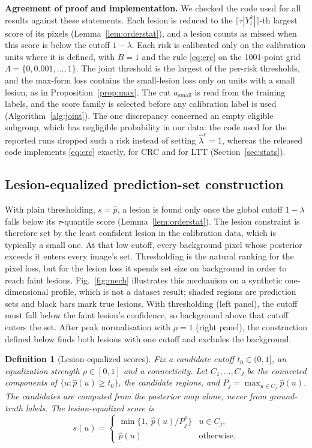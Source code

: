 \documentclass[sn-mathphys-num]{sn-jnl}%
\theoremstyle{thmstyleone}
\theoremstyle{thmstyletwo}
\theoremstyle{thmstylethree}
\newtheorem{definition}{Definition}
\newcommand{\1}{\mathbb{1}}
\newcommand{\lhat}{\hat\lambda}
\begin{document}
\textbf{Agreement of proof and implementation.} We checked the code used for all results against these statements. Each lesion is reduced to the $\lceil\tau|Y_i^k|\rceil$-th largest score of its pixels (Lemma~\ref{lem:orderstat}), and a lesion counts as missed when this score is below the cutoff $1-\lambda$. Each risk is calibrated only on the calibration units where it is defined, with $B=1$ and the rule \eqref{eq:crc} on the 1001-point grid $\Lambda=\{0,0.001,\dots,1\}$. The joint threshold is the largest of the per-risk thresholds, and the max-form loss contains the small-lesion loss only on units with a small lesion, as in Proposition~\ref{prop:max}. The cut $a_{\mathrm{small}}$ is read from the training labels, and the score family is selected before any calibration label is used (Algorithm~\ref{alg:joint}). The one discrepancy concerned an empty eligible subgroup, which has negligible probability in our data: the code used for the reported runs dropped such a risk instead of setting $\lhat^r=1$, whereas the released code implements \eqref{eq:crc} exactly, for CRC and for LTT (Section~\ref{sec:stats}).

\subsection{Lesion-equalized prediction-set construction}\label{sec:family}

With plain thresholding, $s=\hat p$, a lesion is found only once the global cutoff $1-\lambda$ falls below its $\tau$-quantile score (Lemma~\ref{lem:orderstat}). The lesion constraint is therefore set by the least confident lesion in the calibration data, which is typically a small one. At that low cutoff, every background pixel whose posterior exceeds it enters every image's set. Thresholding is the natural ranking for the pixel loss, but for the lesion loss it spends set size on background in order to reach faint lesions. Fig.~\ref{fig:mech} illustrates this mechanism on a synthetic one-dimensional profile, which is not a dataset result; shaded regions are prediction sets and black bars mark true lesions. With thresholding (left panel), the cutoff must fall below the faint lesion's confidence, so background above that cutoff enters the set. After peak normalisation with $\rho=1$ (right panel), the construction defined below finds both lesions with one cutoff and excludes the background.

\begin{definition}[Lesion-equalized scores]\label{def:le}
Fix a candidate cutoff $t_0\in(0,1]$, an equalization strength $\rho\in[0,1]$ and a connectivity. Let $C_1,\dots,C_J$ be the connected components of $\{u:\hat p(u)\ge t_0\}$, the \emph{candidate regions}, and $P_j=\max_{u\in C_j}\hat p(u)$. The candidates are computed from the posterior map alone, never from ground-truth labels. The lesion-equalized score is
\begin{equation}\label{eq:le}
s(u)=\begin{cases}\min\{1,\ \hat p(u)/P_j^{\rho}\} & u\in C_j,\\ \hat p(u) & \text{otherwise.}\end{cases}
\end{equation}
\end{definition}
\end{document}
